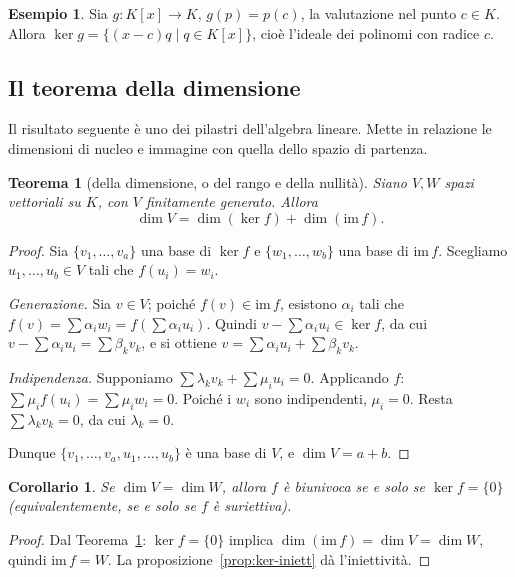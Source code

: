 \documentclass[11pt, a4paper]{book}
\theoremstyle{definition}
\newtheorem{esempio}[definizione]{Esempio}
\theoremstyle{plain}
\newtheorem{teorema}[definizione]{Teorema}
\newtheorem{corollario}[definizione]{Corollario}
\theoremstyle{remark}
\newcommand{\im}{\mathrm{im}\,}
\begin{document}
\begin{exbox}
\begin{esempio}
Sia $g \colon K[x] \to K$, $g(p) = p(c)$, la valutazione nel punto $c \in K$. Allora $\ker g = \{(x-c)q \mid q \in K[x]\}$, cioè l'ideale dei polinomi con radice $c$.
\end{esempio}
\end{exbox}

\subsection{Il teorema della dimensione}

Il risultato seguente è uno dei pilastri dell'algebra lineare. Mette in relazione le dimensioni di nucleo e immagine con quella dello spazio di partenza.

\begin{teorema}[della dimensione, o del rango e della nullità]
\label{thm:dim}
Siano $V, W$ spazi vettoriali su $K$, con $V$ finitamente generato. Allora
\[
  \dim V = \dim(\ker f) + \dim(\im f).
\]
\end{teorema}

\begin{proof}
Sia $\{v_1, \ldots, v_a\}$ una base di $\ker f$ e $\{w_1, \ldots, w_b\}$ una base di $\im f$. Scegliamo $u_1, \ldots, u_b \in V$ tali che $f(u_i) = w_i$.

\emph{Generazione.} Sia $v \in V$; poiché $f(v) \in \im f$, esistono $\alpha_i$ tali che $f(v) = \sum \alpha_i w_i = f(\sum \alpha_i u_i)$. Quindi $v - \sum \alpha_i u_i \in \ker f$, da cui $v - \sum \alpha_i u_i = \sum \beta_k v_k$, e si ottiene $v = \sum \alpha_i u_i + \sum \beta_k v_k$.

\emph{Indipendenza.} Supponiamo $\sum \lambda_k v_k + \sum \mu_i u_i = 0$. Applicando $f$: $\sum \mu_i f(u_i) = \sum \mu_i w_i = 0$. Poiché i $w_i$ sono indipendenti, $\mu_i = 0$. Resta $\sum \lambda_k v_k = 0$, da cui $\lambda_k = 0$.

Dunque $\{v_1, \ldots, v_a, u_1, \ldots, u_b\}$ è una base di $V$, e $\dim V = a + b$.
\end{proof}

\begin{corollario}
\label{cor:ker-dim}
Se $\dim V = \dim W$, allora $f$ è biunivoca se e solo se $\ker f = \{0\}$ (equivalentemente, se e solo se $f$ è suriettiva).
\end{corollario}

\begin{proof}
Dal Teorema~\ref{thm:dim}: $\ker f = \{0\}$ implica $\dim(\im f) = \dim V = \dim W$, quindi $\im f = W$. La proposizione~\ref{prop:ker-iniett} dà l'iniettività.
\end{proof}
\end{document}
